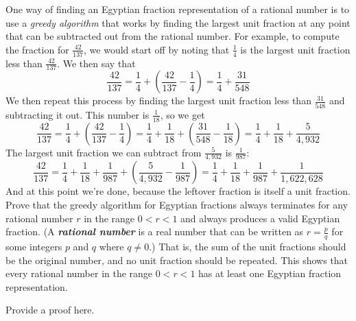 \documentclass{article}
\renewcommand{\(}{\left(}
\renewcommand{\)}{\right)}
\theoremstyle{plain}
\theoremstyle{plain}
\theoremstyle{definition}
\renewcommand{\emph}[1]{\textit{\textbf{#1}}}
\begin{document}
One way of finding an Egyptian fraction representation of a rational number is to use a \textit{greedy algorithm} that works by finding the largest unit fraction at any point that can be subtracted out from the rational number. For example, to compute the fraction for $\frac{42}{137}$, we would start off by noting that $\frac{1}{4}$ is the largest unit fraction less than $\frac{42}{137}$. We then say that
$$\frac{42}{137} = \frac{1}{4} + \left(\frac{42}{137} - \frac{1}{4}\right) = \frac{1}{4} + \frac{31}{548}$$
We then repeat this process by finding the largest unit fraction less than $\frac{31}{548}$ and subtracting it out. This number is $\frac{1}{18}$, so we get
$$\frac{42}{137} = \frac{1}{4} + \left(\frac{42}{137} - \frac{1}{4}\right) = \frac{1}{4} + \frac{1}{18} + \left(\frac{31}{548} - \frac{1}{18}\right) = \frac{1}{4} + \frac{1}{18} + \frac{5}{4,932}$$
The largest unit fraction we can subtract from $\frac{5}{4,932}$ is $\frac{1}{987}$:
$$\frac{42}{137} = \frac{1}{4} + \frac{1}{18} + \frac{1}{987} + \left(\frac{5}{4,932} - \frac{1}{987}\right) = \frac{1}{4} + \frac{1}{18} + \frac{1}{987} + \frac{1}{1,622,628}$$
And at this point we're done, because the leftover fraction is itself a unit fraction. \\

Prove that the greedy algorithm for Egyptian fractions always terminates for any rational number $r$ in the range $0 < r < 1$ and always produces a valid Egyptian fraction. (A \emph{rational number} is a real number that can be written as $r = \frac{p}{q}$ for some integers $p$ and $q$ where $q \neq 0$.) That is, the sum of the unit fractions should be the original number, and no unit fraction should be repeated. This shows that every rational number in the range $0 < r < 1$ has at least one Egyptian fraction representation.
\begin{shaded}
Provide a proof here.
\end{shaded}
\end{document}

